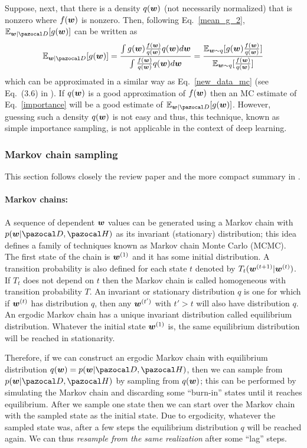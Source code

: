 Suppose, next, that there is a density $q(\boldsymbol{w})$ (not necessarily normalized) that is nonzero where $f(\boldsymbol{w})$ is nonzero. 
Then, following Eq.~\eqref{mean_g_2}, $\mathbb{E}_{\bw|\cD}[g(\bw)]$ can be written as
\begin{equation}\label{importance}
\mathbb{E}_{\bw|\cD}[g(\bw)] = \frac{\int g(\bw)\frac{f(\bw)}{q(\bw)}q(\bw)d\bw}{\int \frac{f(\bw)}{q(\bw)}q(\bw)d\bw} = \frac{\mathbb{E}_{\bw\sim q}[g(\bw)\frac{f(\bw)}{q(\bw)}]}{\mathbb{E}_{\bw\sim q}[\frac{f(\bw)}{q(\bw)}]}
\end{equation}
which can be approximated in a similar way as Eq.~\eqref{new_data_mc} (see Eq.~(3.6) in \cite{neal1993probabilistic}).
If $q(\boldsymbol{w})$ is a good approximation of $f(\boldsymbol{w})$ then an MC estimate of Eq.~\eqref{importance} will be a good estimate of $\mathbb{E}_{\bw|\cD}[g(\bw)]$. 
However, guessing such a density $q(\boldsymbol{w})$ is not easy and thus, this technique, known as simple importance sampling, is not applicable in the context of deep learning. 

\subsubsection{Markov chain sampling}
This section follows closely the review paper \textcite{neal1993probabilistic} and the more compact summary in \textcite{neal1995bayesian}.

\paragraph{Markov chains:}
A sequence of dependent $\boldsymbol{w}$ values can be generated using a Markov chain with $p(\bw|\cD,\cH)$ as its invariant (stationary) distribution; this idea defines a family of techniques known as Markov chain Monte Carlo (MCMC). 
The first state of the chain is $\boldsymbol{w}^{(1)}$ and it has some initial distribution. 
A transition probability is also defined for each state $t$ denoted by $T_t(\boldsymbol{w}^{(t+1)}|\boldsymbol{w}^{(t)})$. 
If $T_t$ does not depend on $t$ then the Markov chain is called homogeneous with transition probability $T$. 
An invariant or stationary distribution $q$ is one for which if $\boldsymbol{w}^{(t)}$ has distribution $q$, then any $\boldsymbol{w}^{(t')}$ with $t'>t$ will also have distribution $q$.
An ergodic Markov chain has a unique invariant distribution called equilibrium distribution. 
Whatever the initial state $\boldsymbol{w}^{(1)}$ is, the same equilibrium distribution will be reached in stationarity. 

Therefore, if we can construct an ergodic Markov chain with equilibrium distribution $q(\bw)=p(\bw|\cD,\cH)$, then we can sample from $p(\bw|\cD,\cH)$ by sampling from $q(\boldsymbol{w})$; this can be performed by simulating the Markov chain and discarding some ``burn-in'' states until it reaches equilibrium. 
After we sample one state then we can start over the Markov chain with the sampled state as the initial state.
Due to ergodicity, whatever the sampled state was, after a few steps the equilibrium distribution $q$ will be reached again. 
We can thus \textit{resample from the same realization} after some ``lag'' steps. 

